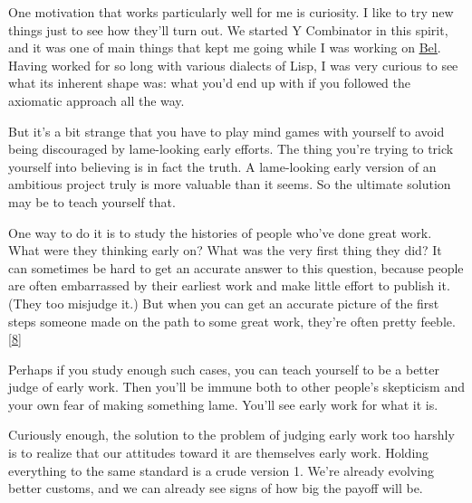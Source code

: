 One motivation that works particularly well for
                  me is curiosity. I like to try new things just to see how
                  they'll turn out. We started Y Combinator in this spirit, and
                  it was one of main things that kept me going while I was
                  working on \href{http://www.paulgraham.com/bel.html}{\underline{Bel}}. Having worked for so long with various dialects of Lisp, I
                  was very curious to see what its inherent shape was: what
                  you'd end up with if you followed the axiomatic approach all
                  the way.

But it's a bit strange that you have to
                  play mind games with yourself to avoid being discouraged by
                  lame-looking early efforts. The thing you're trying to trick
                  yourself into believing is in fact the truth. A lame-looking
                  early version of an ambitious project truly is more valuable
                  than it seems. So the ultimate solution may be to teach
                  yourself that.

One way to do it is to study the
                  histories of people who've done great work. What were they
                  thinking early on? What was the very first thing they did? It
                  can sometimes be hard to get an accurate answer to this
                  question, because people are often embarrassed by their
                  earliest work and make little effort to publish it. (They too
                  misjudge it.) But when you can get an accurate picture of the
                  first steps someone made on the path to some great work,
                  they're often pretty feeble.
                  [\href{\#f8n}{8}]

Perhaps if you study enough such cases, you can
                  teach yourself to be a better judge of early work. Then you'll
                  be immune both to other people's skepticism and your own fear
                  of making something lame. You'll see early work for what it
                  is.

Curiously enough, the solution to the problem
                  of judging early work too harshly is to realize that our
                  attitudes toward it are themselves early work. Holding
                  everything to the same standard is a crude version 1. We're
                  already evolving better customs, and we can already see signs
                  of how big the payoff will be.










